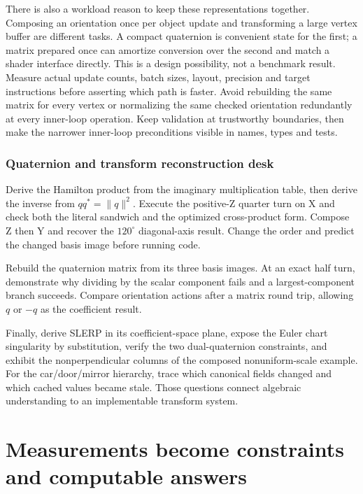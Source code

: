 There is also a workload reason to keep these representations together. Composing an orientation once per object update and transforming a large vertex buffer are different tasks. A compact quaternion is convenient state for the first; a matrix prepared once can amortize conversion over the second and match a shader interface directly. This is a design possibility, not a benchmark result. Measure actual update counts, batch sizes, layout, precision and target instructions before asserting which path is faster. Avoid rebuilding the same matrix for every vertex or normalizing the same checked orientation redundantly at every inner-loop operation. Keep validation at trustworthy boundaries, then make the narrower inner-loop preconditions visible in names, types and tests.

\subsection{Quaternion and transform reconstruction desk}\label{01-foundations-i-ch019-quaternion-and-transform-reconstruction-desk}

Derive the Hamilton product from the imaginary multiplication table, then derive the inverse from \(qq^*=\|q\|^2\). Execute the positive-Z quarter turn on X and check both the literal sandwich and the optimized cross-product form. Compose Z then Y and recover the \(120^\circ\) diagonal-axis result. Change the order and predict the changed basis image before running code.

Rebuild the quaternion matrix from its three basis images. At an exact half turn, demonstrate why dividing by the scalar component fails and a largest-component branch succeeds. Compare orientation actions after a matrix round trip, allowing \(q\) or \(-q\) as the coefficient result.

Finally, derive SLERP in its coefficient-space plane, expose the Euler chart singularity by substitution, verify the two dual-quaternion constraints, and exhibit the nonperpendicular columns of the composed nonuniform-scale example. For the car/door/mirror hierarchy, trace which canonical fields changed and which cached values became stale. Those questions connect algebraic understanding to an implementable transform system.

\chapter{Measurements become constraints and computable answers}\label{01-foundations-i-ch019-measurements-become-constraints-and-computable-answers}

